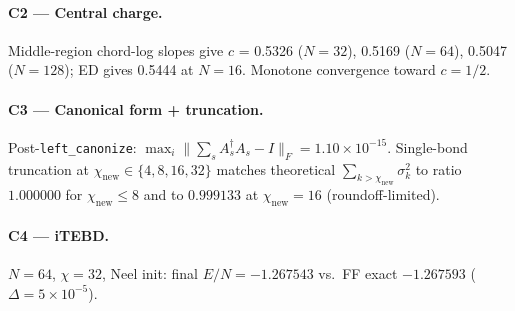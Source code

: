 \documentclass[11pt]{article}
\begin{document}
\paragraph{C2 --- Central charge.}
Middle-region chord-log slopes give $c$ = 0.5326 ($N{=}32$), 0.5169 ($N{=}64$), 0.5047 ($N{=}128$); ED gives 0.5444 at $N{=}16$. Monotone convergence toward $c=1/2$.

\paragraph{C3 --- Canonical form + truncation.}
Post-\texttt{left\_canonize}: $\max_i \lVert \sum_s A_s^\dagger A_s - I\rVert_F = 1.10\times 10^{-15}$. Single-bond truncation at
$\chi_\text{new}\in\{4,8,16,32\}$ matches theoretical $\sum_{k>\chi_\text{new}}\sigma_k^2$ to ratio $1.000000$ for $\chi_\text{new}\le 8$
and to $0.999133$ at $\chi_\text{new}=16$ (roundoff-limited).

\paragraph{C4 --- iTEBD.}
$N{=}64$, $\chi{=}32$, Neel init: final $E/N = -1.267543$ vs.\ FF exact $-1.267593$ ($\Delta = 5\times 10^{-5}$).
\end{document}
